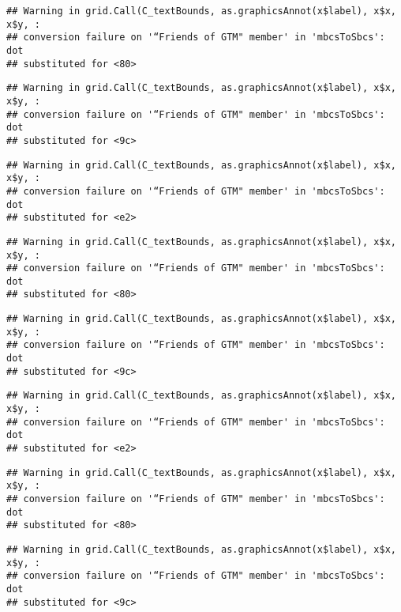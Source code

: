 \documentclass[
]{article}
\begin{document}
\begin{verbatim}
## Warning in grid.Call(C_textBounds, as.graphicsAnnot(x$label), x$x, x$y, :
## conversion failure on '“Friends of GTM" member' in 'mbcsToSbcs': dot
## substituted for <80>
\end{verbatim}

\begin{verbatim}
## Warning in grid.Call(C_textBounds, as.graphicsAnnot(x$label), x$x, x$y, :
## conversion failure on '“Friends of GTM" member' in 'mbcsToSbcs': dot
## substituted for <9c>
\end{verbatim}

\begin{verbatim}
## Warning in grid.Call(C_textBounds, as.graphicsAnnot(x$label), x$x, x$y, :
## conversion failure on '“Friends of GTM" member' in 'mbcsToSbcs': dot
## substituted for <e2>
\end{verbatim}

\begin{verbatim}
## Warning in grid.Call(C_textBounds, as.graphicsAnnot(x$label), x$x, x$y, :
## conversion failure on '“Friends of GTM" member' in 'mbcsToSbcs': dot
## substituted for <80>
\end{verbatim}

\begin{verbatim}
## Warning in grid.Call(C_textBounds, as.graphicsAnnot(x$label), x$x, x$y, :
## conversion failure on '“Friends of GTM" member' in 'mbcsToSbcs': dot
## substituted for <9c>
\end{verbatim}

\begin{verbatim}
## Warning in grid.Call(C_textBounds, as.graphicsAnnot(x$label), x$x, x$y, :
## conversion failure on '“Friends of GTM" member' in 'mbcsToSbcs': dot
## substituted for <e2>
\end{verbatim}

\begin{verbatim}
## Warning in grid.Call(C_textBounds, as.graphicsAnnot(x$label), x$x, x$y, :
## conversion failure on '“Friends of GTM" member' in 'mbcsToSbcs': dot
## substituted for <80>
\end{verbatim}

\begin{verbatim}
## Warning in grid.Call(C_textBounds, as.graphicsAnnot(x$label), x$x, x$y, :
## conversion failure on '“Friends of GTM" member' in 'mbcsToSbcs': dot
## substituted for <9c>
\end{verbatim}
\end{document}
